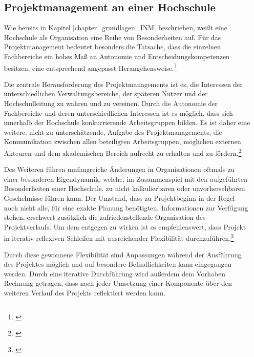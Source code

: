 
\subsection{Projektmanagement an einer Hochschule}
\label{subsection_projektmanagement_hochschule}
Wie bereits in Kapitel \ref{chapter_grundlagen_INM} beschrieben, weißt eine Hochschule als Organisation eine Reihe von Besonderheiten auf. Für das Projektmanagement bedeutet besonders die Tatsache, dass die einzelnen Fachbereiche ein hohes Maß an Autonomie und Entscheidungskompetenzen besitzen, eine entsprechend angepasst Herangehensweise.\footnote{\cite{hansen_business_2009}}

Die zentrale Herausforderung des Projektmanagements ist es, die Interessen der unterschiedlichen Verwaltungsbereiche, der späteren Nutzer und der Hochschulleitung zu wahren und zu vereinen. Durch die Autonomie der Fachbereiche und deren unterschiedlichen Interessen ist es möglich, dass sich innerhalb der Hochschule konkurrierende Arbeitsgruppen bilden. Es ist daher eine weitere, nicht zu unterschätzende, Aufgabe des Projektmanagements, die Kommunikation zwischen allen beteiligten Arbeitsgruppen, möglichen externen Akteuren und dem akademischen Bereich aufrecht zu erhalten und zu fördern.\footnote{\cite{altvater_organisation_2007}}

Des Weiteren führen umfangreiche Änderungen in Organisationen oftmals zu einer besonderen Eigendynamik, welche, im Zusammenspiel mit den aufgeführten Besonderheiten einer Hochschule, zu nicht kalkulierbaren oder unvorhersehbaren Geschehnisse führen kann. Der Umstand, dass zu Projektbeginn in der Regel noch nicht alle, für eine exakte Planung benötigten, Informationen zur Verfügung stehen, erschwert zusätzlich die zufriedenstellende Organisation des Projektverlaufs. Um dem entgegen zu wirken ist es empfehlenswert, dass Projekt in iterativ-reflexiven Schleifen mit ausreichender Flexibilität durchzuführen.\footnote{\cite{hansen_business_2009}}

Durch diese gewonnene Flexibilität sind Anpassungen während der Ausführung des Projektes möglich und auf besondere Befindlichkeiten kann eingegangen werden. Durch eine iterative Durchführung wird außerdem dem Vorhaben Rechnung getragen, dass nach jeder Umsetzung einer Komponente über den weiteren Verlauf des Projekts reflektiert werden kann.

